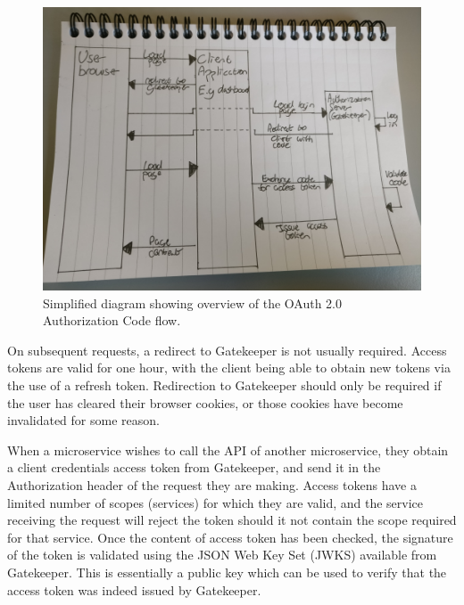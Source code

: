 \begin{figure}[H]
    \centering
    \includegraphics[width=\textwidth]{Images/gatekeeper_authcode_flow.png}
    \caption{Simplified diagram showing overview of the OAuth 2.0 Authorization Code flow.}
\end{figure}

On subsequent requests, a redirect to Gatekeeper is not usually required.  Access tokens are valid for one hour, with the client being able to obtain new tokens via the use of a refresh token.  Redirection to Gatekeeper should only be required if the user has cleared their browser cookies, or those cookies have become invalidated for some reason.

When a microservice wishes to call the API of another microservice, they obtain a client credentials access token from Gatekeeper, and send it in the Authorization header of the request they are making.  Access tokens have a limited number of scopes (services) for which they are valid, and the service receiving the request will reject the token should it not contain the scope required for that service.  Once the content of access token has been checked, the signature of the token is validated using the JSON Web Key Set (JWKS) available from Gatekeeper.  This is essentially a public key which can be used to verify that the access token was indeed issued by Gatekeeper.

